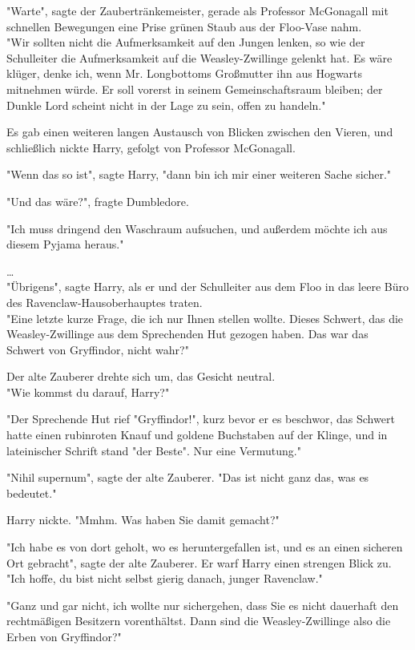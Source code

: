 {"Warte", sagte der Zaubertränkemeister, gerade als Professor McGonagall mit schnellen Bewegungen eine Prise grünen Staub aus der Floo-Vase nahm.\\ "Wir sollten nicht die Aufmerksamkeit auf den Jungen lenken, so wie der Schulleiter die Aufmerksamkeit auf die Weasley-Zwillinge gelenkt hat. Es wäre klüger, denke ich, wenn Mr. Longbottoms Großmutter ihn aus Hogwarts mitnehmen würde. Er soll vorerst in seinem Gemeinschaftsraum bleiben; der Dunkle Lord scheint nicht in der Lage zu sein, offen zu handeln."

Es gab einen weiteren langen Austausch von Blicken zwischen den Vieren, und schließlich nickte Harry, gefolgt von Professor McGonagall.

"Wenn das so ist", sagte Harry, "dann bin ich mir einer weiteren Sache sicher."

"Und das wäre?", fragte Dumbledore.

"Ich muss dringend den Waschraum aufsuchen, und außerdem möchte ich aus diesem Pyjama heraus."

…\\ "Übrigens", sagte Harry, als er und der Schulleiter aus dem Floo in das leere Büro des Ravenclaw-Hausoberhauptes traten.\\ "Eine letzte kurze Frage, die ich nur Ihnen stellen wollte. Dieses Schwert, das die Weasley-Zwillinge aus dem Sprechenden Hut gezogen haben. Das war das Schwert von Gryffindor, nicht wahr?"

Der alte Zauberer drehte sich um, das Gesicht neutral.\\ "Wie kommst du darauf, Harry?"

"Der Sprechende Hut rief "Gryffindor!", kurz bevor er es beschwor, das Schwert hatte einen rubinroten Knauf und goldene Buchstaben auf der Klinge, und in lateinischer Schrift stand "der Beste". Nur eine Vermutung."

"Nihil supernum", sagte der alte Zauberer. "Das ist nicht ganz das, was es bedeutet."

Harry nickte. "Mmhm. Was haben Sie damit gemacht?"

"Ich habe es von dort geholt, wo es heruntergefallen ist, und es an einen sicheren Ort gebracht", sagte der alte Zauberer. Er warf Harry einen strengen Blick zu. "Ich hoffe, du bist nicht selbst gierig danach, junger Ravenclaw."

"Ganz und gar nicht, ich wollte nur sichergehen, dass Sie es nicht dauerhaft den rechtmäßigen Besitzern vorenthältst. Dann sind die Weasley-Zwillinge also die Erben von Gryffindor?"

}
